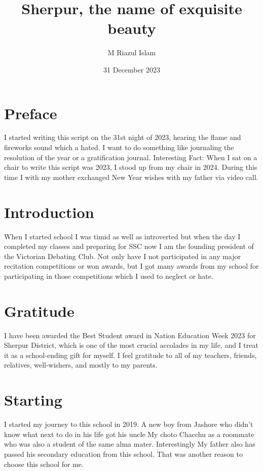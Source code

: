 \documentclass{article}
\title{Sherpur, the name of exquisite beauty}
\author{M Riazul Islam}
\date{31 December 2023}
\begin{document}
\maketitle
\tableofcontents
\break

\section{Preface}
I started writing this script on the 31st night of 2023, hearing the flame and fireworks sound which a hated. I want to do something like journaling the resolution of the year or a gratification journal. Interesting Fact: When I sat on a chair to write this script was 2023, I stood up from my chair in 2024. During this time I with my mother exchanged New Year wishes with my father via video call.

\section{Introduction}

When I started school I was timid as well as introverted but when the day I completed my classes and preparing for SSC now I am the founding president of the Victorian Debating Club. Not only have I not participated in any major recitation competitions or won awards, but I got many awards from my school for participating in those competitions which I used to neglect or hate.

\section{Gratitude}

I have been awarded the Best Student award in Nation Education Week 2023 for Sherpur District, which is one of the most crucial accolades in my life, and I treat it as a school-ending gift for myself.
I feel gratitude to all of my teachers, friends, relatives, well-wishers, and mostly to my parents.

\section{Starting}

I started my journey to this school in 2019. A new boy from Jashore who didn't know what next to do in his life got his uncle My choto Chacchu as a roommate who was also a student of the same alma mater. Interestingly My father also has passed his secondary education from this school. That was another reason to choose this school for me.
\end{document}
